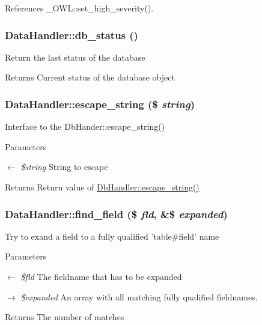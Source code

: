 References \_\-OWL::set\_\-high\_\-severity().

\subsubsection[{db\_\-status}]{\setlength{\rightskip}{0pt plus 5cm}DataHandler::db\_\-status ()}\label{classDataHandler_a3c82ec0a40dabcc55dc203c96abf02d2}
Return the last status of the database

\begin{DoxyReturn}{Returns}
Current status of the database object 
\end{DoxyReturn}
\subsubsection[{escape\_\-string}]{\setlength{\rightskip}{0pt plus 5cm}DataHandler::escape\_\-string (\$ {\em string})}\label{classDataHandler_a435338a167a44a041af2895859abb0c9}
Interface to the DbHander::escape\_\-string()


\begin{DoxyParams}{Parameters}
\item[\mbox{$\leftarrow$} {\em \$string}]String to escape \end{DoxyParams}
\begin{DoxyReturn}{Returns}
Return value of \hyperlink{classDbHandler_a67d77702ff6db70f89123d3f947af143}{DbHandler::escape\_\-string()} 
\end{DoxyReturn}
\subsubsection[{find\_\-field}]{\setlength{\rightskip}{0pt plus 5cm}DataHandler::find\_\-field (\$ {\em fld}, \/  \&\$ {\em expanded})}\label{classDataHandler_a1e4789e22370c96ae479bc3a58f30984}
Try to exand a field to a fully qualified 'table\#field' name


\begin{DoxyParams}{Parameters}
\item[\mbox{$\leftarrow$} {\em \$fld}]The fieldname that has to be expanded \item[\mbox{$\rightarrow$} {\em \$expanded}]An array with all matching fully qualified fieldnames. \end{DoxyParams}
\begin{DoxyReturn}{Returns}
The number of matches 
\end{DoxyReturn}


